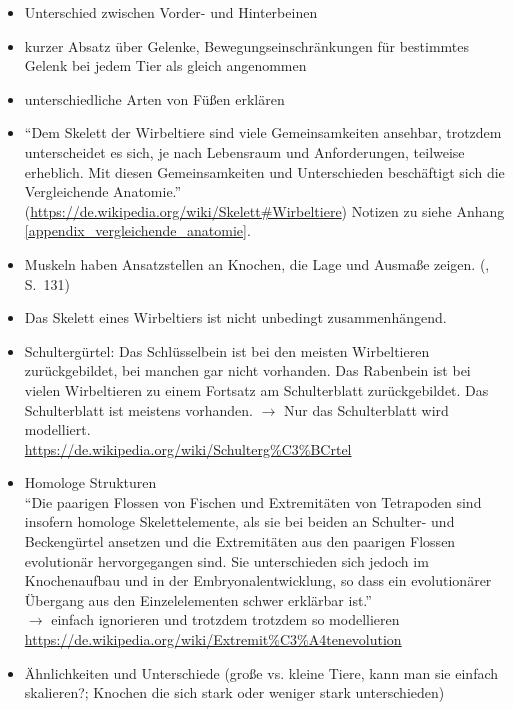 \begin{itemize}
  \item Unterschied zwischen Vorder- und Hinterbeinen
  \item kurzer Absatz über Gelenke, Bewegungseinschränkungen für bestimmtes Gelenk bei jedem Tier als gleich angenommen
  \item unterschiedliche Arten von Füßen erklären

  \item "`Dem Skelett der Wirbeltiere sind viele Gemeinsamkeiten ansehbar, trotzdem unterscheidet es sich, je nach Lebensraum und Anforderungen, teilweise erheblich. Mit diesen Gemeinsamkeiten und Unterschieden beschäftigt sich die Vergleichende Anatomie."' (\url{https://de.wikipedia.org/wiki/Skelett#Wirbeltiere}) Notizen zu \cite{Vergleichende_Anatomie} siehe Anhang \ref{appendix_vergleichende_anatomie}.

 \item Muskeln haben Ansatzstellen an Knochen, die Lage und Ausmaße zeigen. (\cite{Vergleichende_Anatomie}, S.\ 131)
 \item Das Skelett eines Wirbeltiers ist nicht unbedingt zusammenhängend.

 \item Schultergürtel: Das Schlüsselbein ist bei den meisten Wirbeltieren zurückgebildet, bei manchen gar nicht vorhanden. Das Rabenbein ist bei vielen Wirbeltieren zu einem Fortsatz am Schulterblatt zurückgebildet. Das Schulterblatt ist meistens vorhanden. $\rightarrow$ Nur das Schulterblatt wird modelliert.\\
 \url{https://de.wikipedia.org/wiki/Schulterg\%C3\%BCrtel}
 
 \item Homologe Strukturen \\
 "`Die paarigen Flossen von Fischen und Extremitäten von Tetrapoden sind insofern homologe Skelettelemente, als sie bei beiden an Schulter- und Beckengürtel ansetzen und die Extremitäten aus den paarigen Flossen evolutionär hervorgegangen sind.\cite{homology} %
 Sie unterschieden sich jedoch im Knochenaufbau und in der Embryonalentwicklung, so dass ein evolutionärer Übergang aus den Einzelelementen schwer erklärbar ist."'\\
 $\rightarrow$ einfach ignorieren und trotzdem trotzdem so modellieren\\
 \url{https://de.wikipedia.org/wiki/Extremit\%C3\%A4tenevolution}
 
  \item Ähnlichkeiten und Unterschiede (\zb große vs. kleine Tiere, kann man sie einfach skalieren?; Knochen die sich stark oder weniger stark unterschieden)
\end{itemize}

